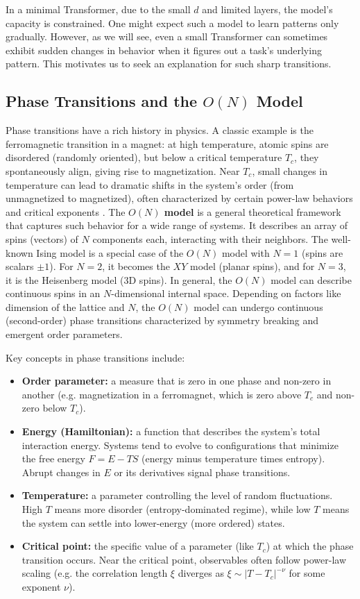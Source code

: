 \documentclass[12pt]{article}
\begin{document}
In a minimal Transformer, due to the small $d$ and limited layers, the model’s capacity is constrained. One might expect such a model to learn patterns only gradually. However, as we will see, even a small Transformer can sometimes exhibit sudden changes in behavior when it figures out a task’s underlying pattern. This motivates us to seek an explanation for such sharp transitions.

\subsection{Phase Transitions and the $O(N)$ Model}
Phase transitions have a rich history in physics. A classic example is the ferromagnetic transition in a magnet: at high temperature, atomic spins are disordered (randomly oriented), but below a critical temperature $T_c$, they spontaneously align, giving rise to magnetization. Near $T_c$, small changes in temperature can lead to dramatic shifts in the system’s order (from unmagnetized to magnetized), often characterized by certain power-law behaviors and critical exponents \citep{sun2025}. The \textbf{$O(N)$ model} is a general theoretical framework that captures such behavior for a wide range of systems. It describes an array of spins (vectors) of $N$ components each, interacting with their neighbors. The well-known Ising model is a special case of the $O(N)$ model with $N=1$ (spins are scalars $\pm1$). For $N=2$, it becomes the $XY$ model (planar spins), and for $N=3$, it is the Heisenberg model (3D spins). In general, the $O(N)$ model can describe continuous spins in an $N$-dimensional internal space. Depending on factors like dimension of the lattice and $N$, the $O(N)$ model can undergo continuous (second-order) phase transitions characterized by symmetry breaking and emergent order parameters.

Key concepts in phase transitions include:
\begin{itemize}
    \item \textbf{Order parameter:} a measure that is zero in one phase and non-zero in another (e.g. magnetization in a ferromagnet, which is zero above $T_c$ and non-zero below $T_c$).
    \item \textbf{Energy (Hamiltonian):} a function that describes the system's total interaction energy. Systems tend to evolve to configurations that minimize the free energy $F = E - TS$ (energy minus temperature times entropy). Abrupt changes in $E$ or its derivatives signal phase transitions.
    \item \textbf{Temperature:} a parameter controlling the level of random fluctuations. High $T$ means more disorder (entropy-dominated regime), while low $T$ means the system can settle into lower-energy (more ordered) states.
    \item \textbf{Critical point:} the specific value of a parameter (like $T_c$) at which the phase transition occurs. Near the critical point, observables often follow power-law scaling (e.g. the correlation length $\xi$ diverges as $\xi \sim |T - T_c|^{-\nu}$ for some exponent $\nu$).
\end{itemize}
\end{document}
